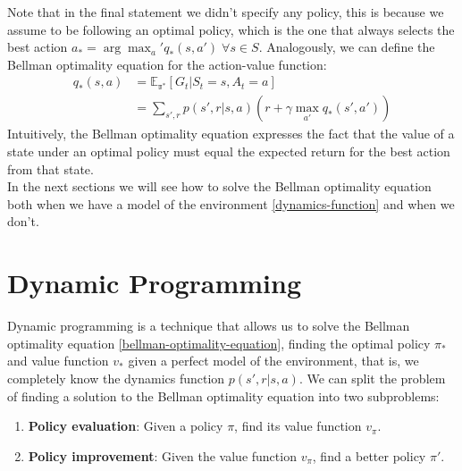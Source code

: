 Note that in the final statement we didn't specify any policy, this is because we assume to be following an optimal policy, which is the one that always selects the best action $a_* = \arg \max_a' q_*(s, a') \; \forall s \in S$.
Analogously, we can define the Bellman optimality equation for the action-value function:
\begin{equation}
    \begin{split}
        q_{*}(s, a) & = \mathds{E_{\pi^*}}[G_t | S_t = s, A_t = a] \\
        & = \sum_{s', r} p(s', r | s, a) (r + \gamma \max_{a'} q_*(s', a'))
    \end{split}
    \label{bellman-optimality-equation-action-value}
\end{equation}
Intuitively, the Bellman optimality equation expresses the fact that the value of a state under an optimal policy must equal the expected return for the best action from that state.\\
In the next sections we will see how to solve the Bellman optimality equation both when we have a model of the environment \ref{dynamics-function} and when we don't.

\section{Dynamic Programming}
Dynamic programming is a technique that allows us to solve the Bellman optimality equation \ref{bellman-optimality-equation}, finding the optimal policy $\pi_*$ and value function $v_*$ given a perfect model of the environment, that is, we completely know the dynamics function $p(s', r | s, a)$.
We can split the problem of finding a solution to the Bellman optimality equation into two subproblems:
\begin{enumerate}
    \item \textbf{Policy evaluation}: Given a policy $\pi$, find its value function $v_{\pi}$.
    \item \textbf{Policy improvement}: Given the value function $v_{\pi}$, find a better policy $\pi'$.
\end{enumerate}

